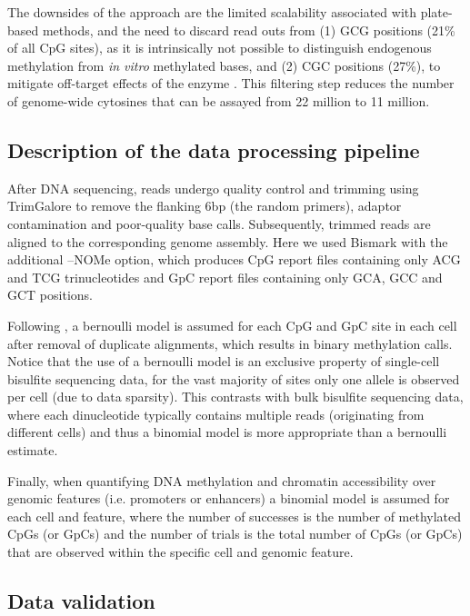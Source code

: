 The downsides of the approach are the limited scalability associated with plate-based methods, and the need to discard read outs from (1) GCG positions (21\% of all CpG sites), as it is intrinsically not possible to distinguish endogenous methylation from \textit{in vitro} methylated bases, and (2) CGC positions (27\%), to mitigate off-target effects of the enzyme \cite{Kelly2012}. This filtering step reduces the number of genome-wide cytosines that can be assayed from 22 million to 11 million. 


\subsection{Description of the data processing pipeline}

After DNA sequencing, reads undergo quality control and trimming using TrimGalore to remove the flanking 6bp (the random primers), adaptor contamination and poor-quality base calls. Subsequently, trimmed reads are aligned to the corresponding genome assembly. Here we used Bismark \cite{Krueger2011} with the additional --NOMe option, which produces CpG report files containing only ACG and TCG trinucleotides and GpC report files containing only GCA, GCC and GCT positions.

Following \cite{Smallwood2014}, a bernoulli model is assumed for each CpG and GpC site in each cell after removal of duplicate alignments, which results in binary methylation calls. Notice that the use of a bernoulli model is an exclusive property of single-cell bisulfite sequencing data, for the vast majority of sites only one allele is observed per cell (due to data sparsity). This contrasts with bulk bisulfite sequencing data, where each dinucleotide typically contains multiple reads (originating from different cells) and thus a binomial model is more appropriate than a bernoulli estimate.

Finally, when quantifying DNA methylation and chromatin accessibility over genomic features (i.e. promoters or enhancers) a binomial model is assumed for each cell and feature, where the number of successes is the number of methylated CpGs (or GpCs) and the number of trials is the total number of CpGs (or GpCs) that are observed within the specific cell and genomic feature.

\subsection{Data validation}

